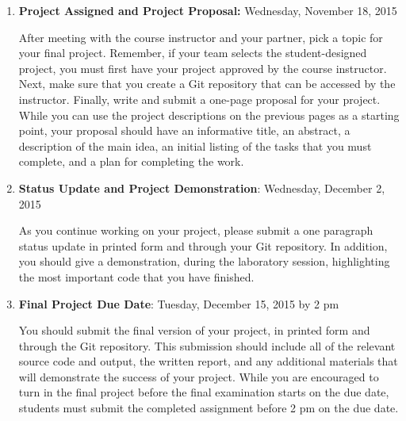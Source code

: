 \vspace*{-.05in}
\begin{enumerate}

  \itemsep0in

  \item {\bf Project Assigned and Project Proposal:} Wednesday, November 18, 2015

    After meeting with the course instructor and your partner, pick a topic for your final project.  Remember, if your
    team selects the student-designed project, you must first have your project approved by the course instructor.
    Next, make sure that you create a Git repository that can be accessed by the instructor. Finally, write and submit a
    one-page proposal for your project. While you can use the project descriptions on the previous pages as a starting
    point, your proposal should have an informative title, an abstract, a description of the main idea, an initial
    listing of the tasks that you must complete, and a plan for completing the work.

  \item {\bf Status Update and Project Demonstration}: Wednesday, December 2, 2015

    As you continue working on your project, please submit a one paragraph status update in printed form and through
    your Git repository.  In addition, you should give a demonstration, during the laboratory session, highlighting the
    most important code that you have finished.

  \item {\bf Final Project Due Date}: Tuesday, December 15, 2015 by 2 pm

    You should submit the final version of your project, in printed form and through the Git repository. This submission
    should include all of the relevant source code and output, the written report, and any additional materials that
    will demonstrate the success of your project.  While you are encouraged to turn in the final project before the
    final examination starts on the due date, students must submit the completed assignment before 2 pm on the due date.

\end{enumerate}
\vspace*{-.05in}


